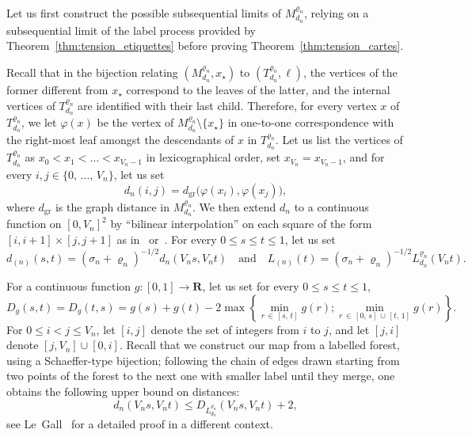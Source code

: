\documentclass[AHL,Unicode,longabstracts,published]{cedram}
\newcommand{\ensembles}[1]{\mathbf{#1}}
\newcommand{\R}{\ensembles{R}}
\newcommand{\1}{\ensembles{1}}
\renewcommand{\le}{\leqslant}
\newcommand{\mn}{M_{d_n}^{\varrho_n}}
\newcommand{\dgr}{d_{\mathrm{gr}}}
\newcommand{\fn}{T_{d_n}^{\varrho_n}}
\newcommand{\Lfn}{L_{d_n}^{\varrho_n}}
\newcommand{\vertices}{V}
\begin{document}
Let us first construct the possible subsequential limits of $\mn$, relying on a subsequential limit of the label process provided by Theorem~\ref{thm:tension_etiquettes} before proving Theorem~\ref{thm:tension_cartes}.

Recall that in the bijection relating $(\mn, x_\star)$ to $(\fn, \ell)$, the vertices of the former different from $x_\star$ correspond to the leaves of the latter, and the internal vertices of $\fn$ are identified with their last child. Therefore, for every vertex $x$ of $\fn$, we let $\varphi(x)$ be the vertex of $\mn\setminus\{x_\star\}$ in one-to-one correspondence with the right-most leaf amongst the descendants of $x$ in $\fn$. Let us list the vertices of $\fn$ as $x_0 < x_1 < \dots < x_{\vertices_n-1}$ in lexicographical order, set $x_{\vertices_n} = x_{\vertices_n-1}$, and for every $i,j \in \{0,\, \dots,\,\vertices_n\}$, let us set
\[
d_n(i,j) = \dgr\big(\varphi(x_i), \varphi(x_j)\big),
\]
where $\dgr$ is the graph distance in $\mn$. We then extend $d_n$ to a continuous function on $[0, \vertices_n]^2$ by ``bilinear interpolation'' on each square of the form $[i,i+1] \times [j,j+1]$ as in~\cite[Section~2.5]{LG13} or~\cite[Section~7]{LGM11}. For every $0 \le s \le t \le 1$, let us set
\[
d_{(n)}(s, t) = \left(\sigma_n + \varrho_n\right)^{-1/2} d_n\left(\vertices_n s, \vertices_n t\right)\quad\text{and}\quad L_{(n)}(t) = \left(\sigma_n + \varrho_n\right)^{-1/2} \Lfn\left(\vertices_n t\right).
\]



For a continuous function $g : [0, 1] \to \R$, let us set for every $0 \le s \le t \le 1$,
\begin{equation}\label{eq:distance_fonction_continue}
D_g(s,t) = D_g(t,s) = g(s) + g(t) - 2 \max\left\{\min_{r\,\in\,[s,\,t]} g(r); \min_{r\, \in\,[0,\,s]\,\cup\,[t,\,1]} g(r)\right\}.
\end{equation}
For $0 \le i < j \le \vertices_n$, let $[i, j]$ denote the set of integers from $i$ to $j$, and let $[j,i]$ denote $[j, \vertices_n] \cup [0, i]$. Recall that we construct our map from a labelled forest, using a Schaeffer-type bijection; following the chain of edges drawn starting from two points of the forest to the next one with smaller label until they merge, one obtains the following upper bound on distances:
\begin{equation}\label{eq:borne_sup_cactus}
d_n\left(\vertices_n s, \vertices_n t\right) \le D_{\Lfn}\left(\vertices_n s, \vertices_n t\right) + 2,
\end{equation}
see Le~Gall~\cite[Lemma~3.1]{LG07} for a detailed proof in a different context.
\end{document}
